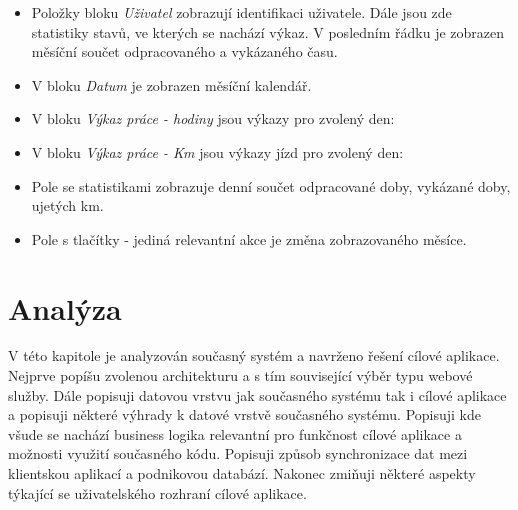 \documentclass{diplomka}
\begin{document}
\begin{itemize}[noitemsep,nolistsep]
\item Položky bloku \emph{Uživatel} zobrazují identifikaci uživatele. Dále jsou zde statistiky stavů, ve kterých se nachází výkaz. V posledním řádku je zobrazen měsíční součet odpracovaného a vykázaného času.
\item V bloku \emph{Datum} je zobrazen měsíční kalendář.
\item V bloku \emph{Výkaz práce - hodiny} jsou výkazy pro zvolený den:
\item V bloku \emph{Výkaz práce - Km} jsou výkazy jízd pro zvolený den:
\item Pole se statistikami zobrazuje denní součet odpracované doby, vykázané doby, ujetých km. 
\item Pole s tlačítky - jediná relevantní akce je změna zobrazovaného měsíce.
\end{itemize}

\chapter{Analýza}
V této kapitole je analyzován současný systém a navrženo řešení cílové aplikace. Nejprve popíšu zvolenou architekturu a s tím související výběr typu webové služby. Dále popisuji datovou vrstvu jak současného systému tak i cílové aplikace a popisuji některé výhrady k datové vrstvě současného systému. Popisuji kde všude se nachází business logika relevantní pro funkčnost cílové aplikace a možnosti využití současného kódu. Popisuji způsob synchronizace dat mezi klientskou aplikací a podnikovou databází. Nakonec zmiňuji některé aspekty týkající se uživatelského rozhraní cílové aplikace.
\end{document}
